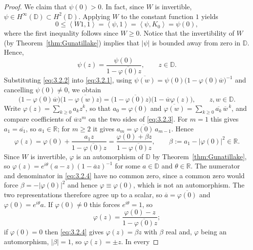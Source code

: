 \documentclass{amsart}
\theoremstyle{definition}
\theoremstyle{remark}
\numberwithin{equation}{section}
\newcommand{\ip}[2]{\left\langle {#1} , {#2} \right\rangle} %
\newcommand{\R}{\mathbb{R}} %
\newcommand{\D}{\mathbb{D}} %
\begin{document}
\begin{proof}
We claim that $\psi(0) >0$. In fact, since $W$ is invertible, $\psi\in H^{\infty}(\mathbb{D})\subset H^{2}(\mathbb{D})$. Applying $W$ to the constant function $1$ yields
\begin{equation*}
    0\leq \ip{W1}{1} =\ip{\psi}{1}=  \ip{\psi}{K_0} = \psi(0),  
\end{equation*}
where the first inequality follows since $W\geq 0$. Notice that the invertibility of $W$ (by Theorem~\ref{thm:Gunatillake}) implies that $|\psi|$ is bounded away from zero in $\D$.  Hence,
\begin{equation}\label{eq:3.2.2}
  \psi(z)=\frac{\psi(0)}{1-\overline{\varphi(0)}z},\qquad z\in\D .
\end{equation}
Substituting \eqref{eq:3.2.2} into \eqref{eq:3.2.1}, using
$\overline{\psi(w)}=\psi(0)\bigl(1-\varphi(0)\overline{w}\bigr)^{-1}$ and cancelling
$\psi(0)\neq0$, we obtain
\begin{equation}\label{eq:3.2.3}
  \bigl(1-\varphi(0)\overline{w}\bigr)\bigl(1-\overline{\varphi(w)}z\bigr)
  =\bigl(1-\overline{\varphi(0)}z\bigr)\bigl(1-\overline{w}\varphi(z)\bigr),
  \qquad z,w\in\D .
\end{equation}
Write $\varphi(z)=\sum_{k\ge0}a_kz^{k}$, so that $a_0=\varphi(0)$ and
$\overline{\varphi(w)}=\sum_{k\ge0}\overline{a_k}\,\overline{w}^{\,k}$, and
compare coefficients of $\overline{w}z^{m}$ on the two sides of
\eqref{eq:3.2.3}.  For $m=1$ this gives $a_1=\overline{a_1}$, so $a_1\in\R$; for
$m\ge2$ it gives $a_{m}=\overline{\varphi(0)}\,a_{m-1}$.  Hence
\begin{equation}\label{eq:3.2.4}
  \varphi(z)=\varphi(0)+\frac{a_1z}{1-\overline{\varphi(0)}z}
           =\frac{\varphi(0)+\beta z}{1-\overline{\varphi(0)}z},
  \qquad \beta:=a_1-|\varphi(0)|^{2}\in\R .
\end{equation}
 Since $W$ is invertible, $\varphi$ is an automorphism of $\D$ by Theorem~\ref{thm:Gunatillake}, so
$\varphi(z)=e^{i\theta}(a-z)(1-\overline{a}z)^{-1}$ for some $a\in\D$ and
$\theta\in\R$. The numerator and denominator in
\eqref{eq:3.2.4} have no common zero, since a common zero would force
$\beta=-|\varphi(0)|^{2}$ and hence $\varphi\equiv \varphi(0)$, which is not an automorphism.
The two representations therefore agree up to a scalar, so
$\overline{a}=\overline{\varphi(0)}$ and $\varphi(0)=e^{i\theta}a$.  If $\varphi(0)\neq0$
this forces $e^{i\theta}=1$, so
\[
  \varphi(z)=\frac{\varphi(0)-z}{1-\overline{\varphi(0)}z};
\]
if $\varphi(0)=0$ then \eqref{eq:3.2.4} gives $\varphi(z)=\beta z$ with $\beta$ real and,
$\varphi$ being an automorphism, $|\beta|=1$, so $\varphi(z)=\pm z$.  In every

\end{proof}
\end{document}
